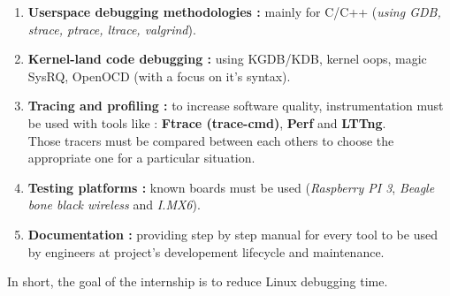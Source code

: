 \begin{enumerate}
	\item \textbf{Userspace debugging methodologies : } mainly for C/C++ (\textit{using GDB, strace, ptrace, ltrace, valgrind}).
	
	\item \textbf{Kernel-land code debugging : } using KGDB/KDB, kernel oops, magic SysRQ, OpenOCD (with a focus on it's syntax).
	
	\item \textbf{Tracing and profiling : } to increase software quality, instrumentation must be used with tools like : \textbf{Ftrace (trace-cmd)}, \textbf{Perf} and \textbf{LTTng}.\\
Those tracers must be compared  between each others to choose the appropriate one for a particular situation.

	\item \textbf{Testing platforms : } known boards must be used (\textit{Raspberry PI 3}, \textit{Beagle bone black wireless} and \textit{I.MX6}).
	
	\item \textbf{Documentation : } providing step by step manual for every tool to be used by engineers at project's developement lifecycle and maintenance.
\end{enumerate}


\begin{center}\Large
\color{red}In short, the goal of the internship is to reduce Linux debugging time.
\end{center}

